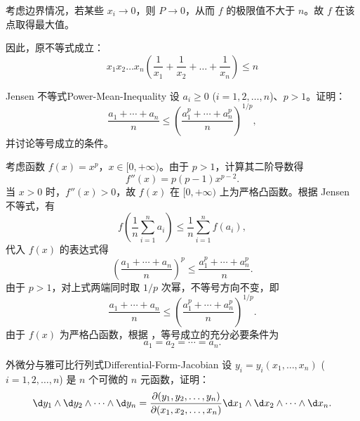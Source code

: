 \begin{myproof}
    考虑边界情况，若某些 $x_i \to 0$，则 $P \to 0$，从而 $f$ 的极限值不大于 $n$。故 $f$ 在该点取得最大值。

    因此，原不等式成立：
    \begin{equation}
        \boxed{x_1 x_2 \dots x_n \left( \frac{1}{x_1} + \frac{1}{x_2} + \dots + \frac{1}{x_n} \right) \leqslant n}
    \end{equation}
\end{myproof}



\begin{problem}{Jensen 不等式}{Power-Mean-Inequality}
    设 $a_i \ge 0$ ($i = 1, 2, \dots, n$)、$p > 1$。证明：
    \begin{equation}
        \frac{a_1 + \cdots + a_n}{n} \le \left( \frac{a_1^p + \cdots + a_n^p}{n} \right)^{1/p},
    \end{equation}
    并讨论等号成立的条件。
\end{problem}

\begin{myproof}
    考虑函数 $f(x) = x^p$，$x \in [0, +\infty)$。由于 $p > 1$，计算其二阶导数得
    \begin{equation}
        f''(x) = p(p-1)x^{p-2}. \label{eq:second-derivative}
    \end{equation}
    当 $x > 0$ 时，$f''(x) > 0$，故 $f(x)$ 在 $[0, +\infty)$ 上为严格凸函数。根据 Jensen 不等式，有
    \begin{equation}
        f\left( \frac{1}{n} \sum_{i=1}^{n} a_i \right) \le \frac{1}{n} \sum_{i=1}^{n} f(a_i), \label{eq:jensen-apply}
    \end{equation}
    代入 $f(x)$ 的表达式得
    \begin{equation}
        \left( \frac{a_1 + \cdots + a_n}{n} \right)^p \le \frac{a_1^p + \cdots + a_n^p}{n}.
    \end{equation}
    由于 $p > 1$，对上式两端同时取 $1/p$ 次幂，不等号方向不变，即
    \begin{equation}
        \frac{a_1 + \cdots + a_n}{n} \le \left( \frac{a_1^p + \cdots + a_n^p}{n} \right)^{1/p}.
    \end{equation}
    由于 $f(x)$ 为严格凸函数，根据 ，等号成立的充分必要条件为
    \begin{equation}
        \boxed{a_1 = a_2 = \cdots = a_n.}
    \end{equation}
\end{myproof}


\begin{problem}{外微分与雅可比行列式}{Differential-Form-Jacobian}
    设 $y_i = y_i(x_1, \dots, x_n)$ ($i = 1, 2, \dots, n$) 是 $n$ 个可微的 $n$ 元函数，证明：
    \begin{equation}
        \d y_1 \wedge \d y_2 \wedge \dots \wedge \d y_n = \frac{\partial(y_1, y_2, \dots, y_n)}{\partial(x_1, x_2, \dots, x_n)} \d x_1 \wedge \d x_2 \wedge \dots \wedge \d x_n.
    \end{equation}
\end{problem}

